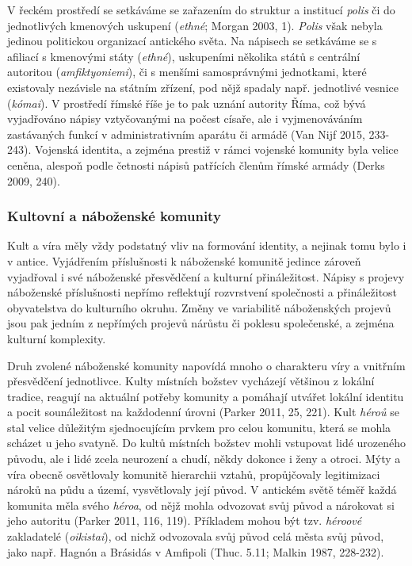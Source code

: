 V řeckém prostředí se setkáváme se zařazením do struktur a institucí {\em polis} či do jednotlivých kmenových uskupení ({\em ethné}; Morgan 2003, 1). {\em Polis} však nebyla jedinou politickou organizací antického světa. Na nápisech se setkáváme se s afiliací s kmenovými státy ({\em ethné}), uskupeními několika států s centrální autoritou ({\em amfiktyoniemi}), či s menšími samosprávnými jednotkami, které existovaly nezávisle na státním zřízení, pod nějž spadaly např. jednotlivé vesnice ({\em kómai}). V prostředí římské říše je to pak uznání autority Říma, což bývá vyjadřováno nápisy vztyčovanými na počest císaře, ale i vyjmenováváním zastávaných funkcí v administrativním aparátu či armádě (Van Nijf 2015, 233-243). Vojenská identita, a zejména prestiž v rámci vojenské komunity byla velice ceněna, alespoň podle četnosti nápisů patřících členům římské armády (Derks 2009, 240).

\subsubsection[kultovní-a-náboženské-komunity]{Kultovní a náboženské komunity}

Kult a víra měly vždy podstatný vliv na formování identity, a nejinak tomu bylo i v antice. Vyjádřením příslušnosti k náboženské komunitě jedince zároveň vyjadřoval i své náboženské přesvědčení a kulturní přináležitost. Nápisy s projevy náboženské příslušnosti nepřímo reflektují rozvrstvení společnosti a přináležitost obyvatelstva do kulturního okruhu. Změny ve variabilitě náboženských projevů jsou pak jedním z nepřímých projevů nárůstu či poklesu společenské, a zejména kulturní komplexity.

Druh zvolené náboženské komunity napovídá mnoho o charakteru víry a vnitřním přesvědčení jednotlivce. Kulty místních božstev vycházejí většinou z lokální tradice, reagují na aktuální potřeby komunity a pomáhají utvářet lokální identitu a pocit sounáležitost na každodenní úrovni (Parker 2011, 25, 221). Kult {\em héroů} se stal velice důležitým sjednocujícím prvkem pro celou komunitu, která se mohla scházet u jeho svatyně. Do kultů místních božstev mohli vstupovat lidé urozeného původu, ale i lidé zcela neurození a chudí, někdy dokonce i ženy a otroci. Mýty a víra obecně osvětlovaly komunitě hierarchii vztahů, propůjčovaly legitimizaci nároků na půdu a území, vysvětlovaly její původ. V antickém světě téměř každá komunita měla svého {\em héroa}, od nějž mohla odvozovat svůj původ a nárokovat si jeho autoritu (Parker 2011, 116, 119). Příkladem mohou být tzv. {\em héroové} zakladatelé ({\em oikistai}), od nichž odvozovala svůj původ celá města svůj původ, jako např. Hagnón a Brásidás v Amfipoli (Thuc. 5.11; Malkin 1987, 228-232).

